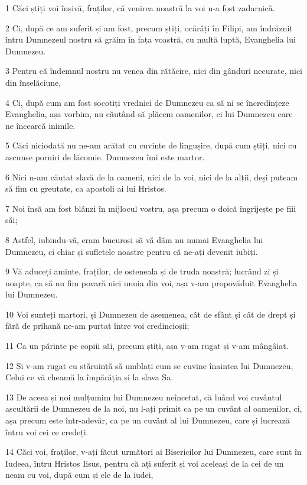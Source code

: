 \par 1 Căci știți voi înșivă, fraților, că venirea noastră la voi n-a fost zadarnică.
\par 2 Ci, după ce am suferit și am fost, precum știți, ocărâți în Filipi, am îndrăznit întru Dumnezeul nostru să grăim în fața voastră, cu multă luptă, Evanghelia lui Dumnezeu.
\par 3 Pentru că îndemnul nostru nu venea din rătăcire, nici din gânduri necurate, nici din înșelăciune,
\par 4 Ci, după cum am fost socotiți vrednici de Dumnezeu ca să ni se încredințeze Evanghelia, așa vorbim, nu căutând să plăcem oamenilor, ci lui Dumnezeu care ne încearcă inimile.
\par 5 Căci niciodată nu ne-am arătat cu cuvinte de lingușire, după cum știți, nici cu ascunse porniri de lăcomie. Dumnezeu îmi este martor.
\par 6 Nici n-am căutat slavă de la oameni, nici de la voi, nici de la alții, deși puteam să fim cu greutate, ca apostoli ai lui Hristos.
\par 7 Noi însă am fost blânzi în mijlocul vostru, așa precum o doică îngrijește pe fiii săi;
\par 8 Astfel, iubindu-vă, eram bucuroși să vă dăm nu numai Evanghelia lui Dumnezeu, ci chiar și sufletele noastre pentru că ne-ați devenit iubiți.
\par 9 Vă aduceți aminte, fraților, de osteneala și de truda noastră; lucrând zi și noapte, ca să nu fim povară nici unuia din voi, așa v-am propovăduit Evanghelia lui Dumnezeu.
\par 10 Voi sunteți martori, și Dumnezeu de asemenea, cât de sfânt și cât de drept și fără de prihană ne-am purtat între voi credincioșii;
\par 11 Ca un părinte pe copiii săi, precum știți, așa v-am rugat și v-am mângâiat.
\par 12 Și v-am rugat cu stăruință să umblați cum se cuvine înaintea lui Dumnezeu, Celui ce vă cheamă la împărăția și la slava Sa.
\par 13 De aceea și noi mulțumim lui Dumnezeu neîncetat, că luând voi cuvântul ascultării de Dumnezeu de la noi, nu l-ați primit ca pe un cuvânt al oamenilor, ci, așa precum este într-adevăr, ca pe un cuvânt al lui Dumnezeu, care și lucrează întru voi cei ce credeți.
\par 14 Căci voi, fraților, v-ați făcut următori ai Bisericilor lui Dumnezeu, care sunt în Iudeea, întru Hristos Iisus, pentru că ați suferit și voi aceleași de la cei de un neam cu voi, după cum și ele de la iudei,
